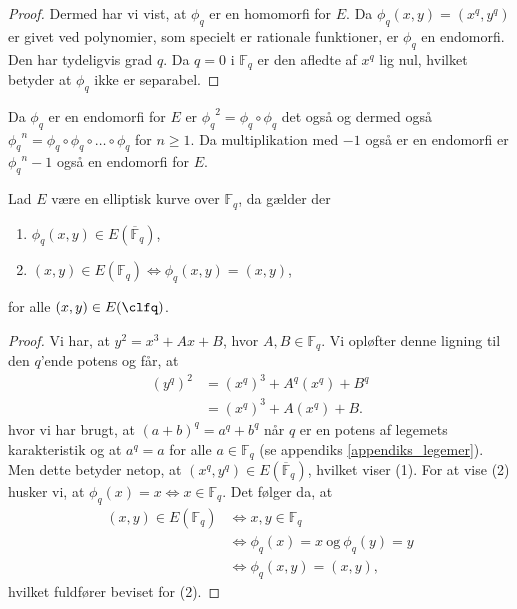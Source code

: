 \begin{proof}
Dermed har vi vist, at $\phi_q$ er en homomorfi for $E$. Da $\phi_q(x, y) = (x^q, y^q)$ er givet ved polynomier, som specielt er rationale funktioner, er $\phi_q$ en endomorfi. Den har tydeligvis grad $q$. Da $q=0$ i $\mathbb{F}_q$ er den afledte af $x^q$ lig nul, hvilket betyder at $\phi_q$ ikke er separabel.
\end{proof}

\begin{remark}
Da $\phi_q$ er en endomorfi for $E$ er ${\phi_q}^2 = \phi_q \circ \phi_q$ det også og dermed også 
${\phi_q}^n = \phi_q \circ \phi_q \circ \ldots \circ \phi_q$ for $n \geq 1$. Da multiplikation med $-1$ også er en endomorfi er ${\phi_q}^n - 1$ også en endomorfi for $E$.
\end{remark}

\begin{lemma}
\label{lemma03}
Lad $E$ være en elliptisk kurve over $\mathbb{F}_q$, da gælder der
\begin{enumerate}
	\item $\phi_q(x, y) \in E(\overline{\mathbb{F}}_q)$,
	\item $(x, y) \in E(\mathbb{F}_q) \Leftrightarrow \phi_q(x, y)=(x, y)$,
\end{enumerate}
for alle $(x, y) \in E(\clfq)$.
\end{lemma}
\begin{proof}
Vi har, at $y^2 = x^3 + Ax + B$, hvor $A, B \in \mathbb{F}_q$. Vi opløfter 
denne ligning til den $q$'ende potens og får, at 
\begin{align*}
	(y^q)^2 &= (x^q)^3 + A^q (x^q) + B^q \\
	&= (x^q)^3 + A (x^q) + B.
\end{align*}
hvor vi har brugt, at $(a+b)^q = a^q + b^q$ når $q$ er en potens af legemets karakteristik 
og at $a^q = a$ for alle $a \in \mathbb{F}_q$ (se appendiks \ref{appendiks_legemer}).
Men dette betyder netop, at 
$(x^q, y^q) \in E(\overline{\mathbb{F}}_q)$, hvilket viser (1).
For at vise (2) husker vi, at $\phi_q(x) = x \Leftrightarrow x \in \mathbb{F}_q$.
Det følger da, at 
\begin{align*}
	(x, y) \in E(\mathbb{F}_q) &\Leftrightarrow x, y \in \mathbb{F}_q \\
	&\Leftrightarrow \phi_q(x) = x \ \text{og} \ \phi_q(y) = y \\
	&\Leftrightarrow \phi_q(x, y) = (x, y),
\end{align*}
hvilket fuldfører beviset for (2).
\end{proof}

